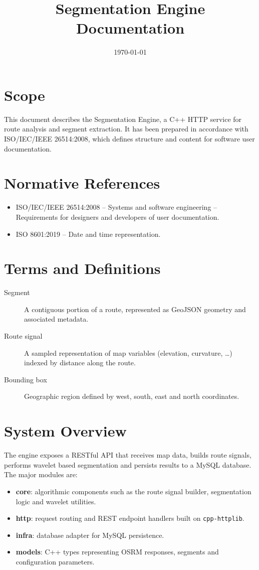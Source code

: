 \documentclass{article}
\begin{document}
\title{Segmentation Engine Documentation}
\author{}
\date{\today}
\maketitle

\section{Scope}
This document describes the Segmentation Engine, a C++ HTTP service for route analysis and segment extraction. It has been prepared in accordance with ISO/IEC/IEEE 26514:2008, which defines structure and content for software user documentation.

\section{Normative References}
\begin{itemize}
\item ISO/IEC/IEEE 26514:2008 -- Systems and software engineering -- Requirements for designers and developers of user documentation.
\item ISO 8601:2019 -- Date and time representation.
\end{itemize}

\section{Terms and Definitions}
\begin{description}
\item[Segment] A contiguous portion of a route, represented as GeoJSON geometry and associated metadata.
\item[Route signal] A sampled representation of map variables (elevation, curvature, \ldots) indexed by distance along the route.
\item[Bounding box] Geographic region defined by west, south, east and north coordinates.
\end{description}

\section{System Overview}
The engine exposes a RESTful API that receives map data, builds route signals, performs wavelet based segmentation and persists results to a MySQL database. The major modules are:
\begin{itemize}
\item \textbf{core}: algorithmic components such as the route signal builder, segmentation logic and wavelet utilities.
\item \textbf{http}: request routing and REST endpoint handlers built on \texttt{cpp-httplib}.
\item \textbf{infra}: database adapter for MySQL persistence.
\item \textbf{models}: C++ types representing OSRM responses, segments and configuration parameters.
\end{itemize}
\end{document}
